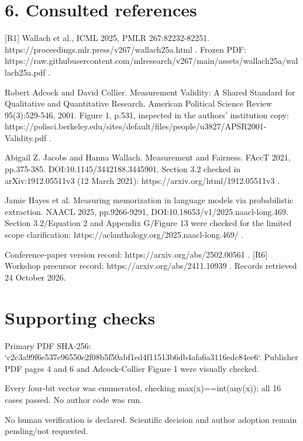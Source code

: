 \documentclass[10pt]{article}
\begin{document}
\section*{6. Consulted references}
[R1] Wallach et al., ICML 2025, PMLR 267:82232-82251. https://proceedings.mlr.press/v267/wallach25a.html . Frozen PDF: https://raw.githubusercontent.com/mlresearch/v267/main/assets/wallach25a/wallach25a.pdf .\par
[R2] Robert Adcock and David Collier. Measurement Validity: A Shared Standard for Qualitative and Quantitative Research. American Political Science Review 95(3):529-546, 2001. Figure 1, p.531, inspected in the authors’ institution copy: https://polisci.berkeley.edu/sites/default/files/people/u3827/APSR2001-Validity.pdf .\par
[R3] Abigail Z. Jacobs and Hanna Wallach. Measurement and Fairness. FAccT 2021, pp.375-385. DOI:10.1145/3442188.3445901. Section 3.2 checked in arXiv:1912.05511v3 (12 March 2021): https://arxiv.org/html/1912.05511v3 .\par
[R4] Jamie Hayes et al. Measuring memorization in language models via probabilistic extraction. NAACL 2025, pp.9266-9291, DOI:10.18653/v1/2025.naacl-long.469. Section 3.2/Equation 2 and Appendix G/Figure 13 were checked for the limited scope clarification: https://aclanthology.org/2025.naacl-long.469/ .\par
[R5] Conference-paper version record: https://arxiv.org/abs/2502.00561 . [R6] Workshop precursor record: https://arxiv.org/abs/2411.10939 . Records retrieved 24 October 2026.\par
\section*{Supporting checks}
Primary PDF SHA-256: `c2c3a99f6e537e96550e2f08b5f50abf1ed4f11513b6db4afa6a3116edc84ee6`. Publisher PDF pages 4 and 6 and Adcock-Collier Figure 1 were visually checked.\par
Every four-bit vector was enumerated, checking max(x)==int(any(x)); all 16 cases passed. No author code was run.\par
No human verification is declared. Scientific decision and author adoption remain pending/not requested.\par
\end{document}
